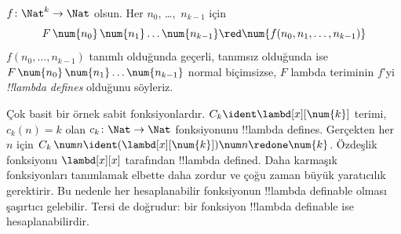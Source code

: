 \documentclass[../../../include/open-logic-section]{subfiles}
\begin{document}
\begin{defn}
$f\colon\Nat^k\to\Nat$ olsun. Her $n_0$, \dots,~$n_{k-1}$ için
\[
F \, \num{n_0} \, \num{n_1} \dots \num{n_{k-1}} \red
\num{f(n_0,n_1,\dots,n_{k-1})}
\]
$f(n_0,\dots,n_{k-1})$ tanımlı olduğunda geçerli, tanımsız olduğunda ise
$F\,\num{n_0}\,\num{n_1}\dots\num{n_{k-1}}$ normal biçimsizse, $F$ lambda
teriminin $f$'yi \emph{!!{lambda define}s} olduğunu söyleriz.
\end{defn}

Çok basit bir örnek sabit fonksiyonlardır. $C_k\ident\lambd[x][\num{k}]$
terimi, $c_k(n)=k$ olan $c_k\colon\Nat\to\Nat$ fonksiyonunu
!!{lambda define}s. Gerçekten her $n$ için
$C_k\,\num n\ident(\lambd[x][\num{k}])\num n\redone\num{k}$.
Özdeşlik fonksiyonu $\lambd[x][x]$ tarafından !!{lambda defined}.
Daha karmaşık fonksiyonları tanımlamak elbette daha zordur ve çoğu zaman
büyük yaratıcılık gerektirir. Bu nedenle her hesaplanabilir fonksiyonun
!!{lambda definable} olması şaşırtıcı gelebilir. Tersi de doğrudur: bir
fonksiyon !!{lambda definable} ise hesaplanabilirdir.
\end{document}
